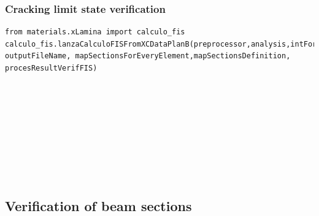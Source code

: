 \subsubsection{Cracking limit state verification}
\begin{verbatim}
from materials.xLamina import calculo_fis
calculo_fis.lanzaCalculoFISFromXCDataPlanB(preprocessor,analysis,intForcCombFileName,
outputFileName, mapSectionsForEveryElement,mapSectionsDefinition,
procesResultVerifFIS)
\end{verbatim}
\begin{paramFuncTable}
\preprocessor{} \\
\analysis{} \\
\\
\outputFileName{}\\
\mapSectionsForEveryElement{} \\
\mapSectionsDefinition{} \\
\mapInteractionDiagrams{} \\
\procesResultVerifFIS{} \\
\end{paramFuncTable}








\subsection{Verification of beam sections}

